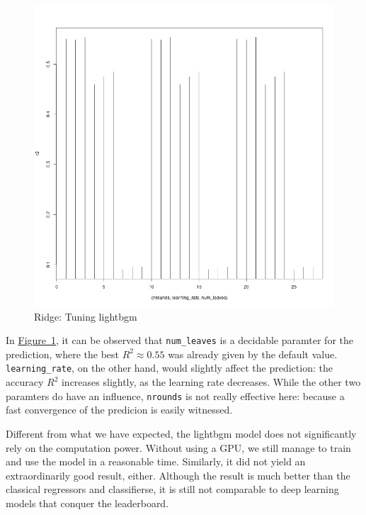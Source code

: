 \documentclass[8pt]{report}
\begin{document}
\begin{figure}[H]
    \centering
    \includegraphics*[scale=0.15]{figures/rsquare_lightbgm.png}
    \caption{Ridge: Tuning lightbgm}
\label{fig:lightbgm}
\end{figure}
In \hyperref[fig:lightbgm]{Figure~\ref*{fig:lightbgm}}, it can be observed that \texttt{num\_leaves} is a decidable 
paramter for the prediction, where the best $R^2 \approx 0.55$ was already given by the default value.
\texttt{learning\_rate}, on the other hand, would slightly affect the prediction: 
the accuracy $R^2$ increases slightly, as the learning rate decreases. While the other two 
paramters do have an influence, \texttt{nrounds} is not really effective here:
because a fast convergence of the predicion is easily witnessed.  

Different from what we have expected, the lightbgm model does not significantly rely on the computation power. 
Without using a GPU, we still manage to train and use the model in a reasonable time. 
Similarly, it did not yield an extraordinarily good result, either. Although the result is much better
than the classical regressors and classifierse, it is still not comparable to deep learning models 
that conquer the leaderboard.
\end{document}
